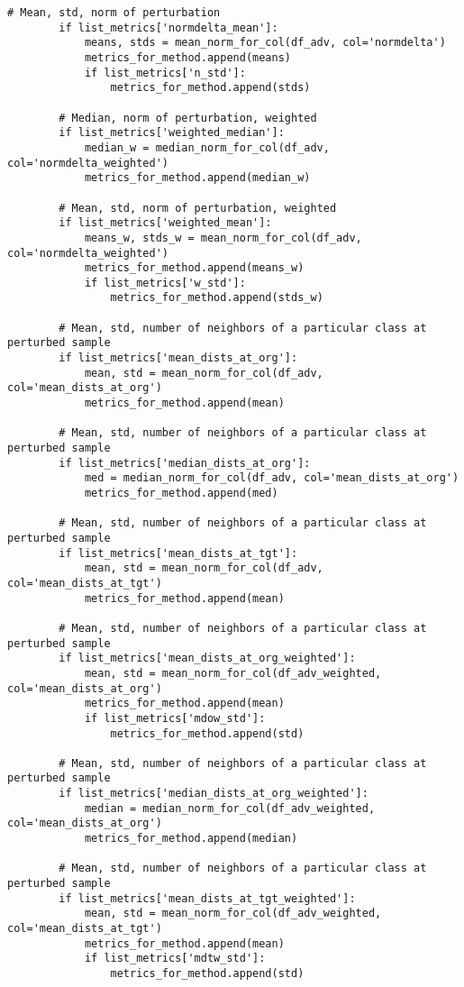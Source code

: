 \begin{lstlisting}[style=python, caption=評価指標の計算を行うMetrics.py]
        # Mean, std, norm of perturbation
        if list_metrics['normdelta_mean']:
            means, stds = mean_norm_for_col(df_adv, col='normdelta')
            metrics_for_method.append(means)
            if list_metrics['n_std']:
                metrics_for_method.append(stds)

        # Median, norm of perturbation, weighted
        if list_metrics['weighted_median']:
            median_w = median_norm_for_col(df_adv, col='normdelta_weighted')
            metrics_for_method.append(median_w)

        # Mean, std, norm of perturbation, weighted
        if list_metrics['weighted_mean']:
            means_w, stds_w = mean_norm_for_col(df_adv, col='normdelta_weighted')
            metrics_for_method.append(means_w)
            if list_metrics['w_std']:
                metrics_for_method.append(stds_w) 

        # Mean, std, number of neighbors of a particular class at perturbed sample
        if list_metrics['mean_dists_at_org']:
            mean, std = mean_norm_for_col(df_adv, col='mean_dists_at_org')
            metrics_for_method.append(mean)

        # Mean, std, number of neighbors of a particular class at perturbed sample
        if list_metrics['median_dists_at_org']:
            med = median_norm_for_col(df_adv, col='mean_dists_at_org')
            metrics_for_method.append(med)

        # Mean, std, number of neighbors of a particular class at perturbed sample
        if list_metrics['mean_dists_at_tgt']:
            mean, std = mean_norm_for_col(df_adv, col='mean_dists_at_tgt')
            metrics_for_method.append(mean)

        # Mean, std, number of neighbors of a particular class at perturbed sample
        if list_metrics['mean_dists_at_org_weighted']:
            mean, std = mean_norm_for_col(df_adv_weighted, col='mean_dists_at_org')
            metrics_for_method.append(mean)
            if list_metrics['mdow_std']:
                metrics_for_method.append(std)

        # Mean, std, number of neighbors of a particular class at perturbed sample
        if list_metrics['median_dists_at_org_weighted']:
            median = median_norm_for_col(df_adv_weighted, col='mean_dists_at_org')
            metrics_for_method.append(median)

        # Mean, std, number of neighbors of a particular class at perturbed sample
        if list_metrics['mean_dists_at_tgt_weighted']:
            mean, std = mean_norm_for_col(df_adv_weighted, col='mean_dists_at_tgt')
            metrics_for_method.append(mean)
            if list_metrics['mdtw_std']:
                metrics_for_method.append(std)


\end{lstlisting}
